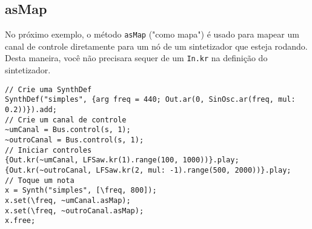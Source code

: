 \subsection{asMap}

No próximo exemplo, o método \texttt{asMap} ("como mapa") é usado para mapear um canal de controle diretamente para um nó de um sintetizador que esteja rodando. Desta maneira, você não precisara sequer de um \texttt{In.kr} na definição do sintetizador.

\begin{lstlisting}[style=SuperCollider-IDE, basicstyle=\scttfamily\footnotesize]
// Crie uma SynthDef
SynthDef("simples", {arg freq = 440; Out.ar(0, SinOsc.ar(freq, mul: 0.2))}).add;
// Crie um canal de controle
~umCanal = Bus.control(s, 1);
~outroCanal = Bus.control(s, 1);
// Iniciar controles
{Out.kr(~umCanal, LFSaw.kr(1).range(100, 1000))}.play;
{Out.kr(~outroCanal, LFSaw.kr(2, mul: -1).range(500, 2000))}.play;
// Toque um nota
x = Synth("simples", [\freq, 800]);
x.set(\freq, ~umCanal.asMap);
x.set(\freq, ~outroCanal.asMap);
x.free;
\end{lstlisting}
